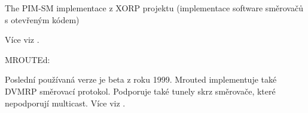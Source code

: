 The PIM-SM implementace z XORP projektu (implementace software směrovačů s otevřeným kódem)

\vspace{10pt}

Více viz \cite{pimdURL}.

\vspace{10pt}

MROUTEd:

\vspace{5pt}

Poslední používaná verze je beta z roku 1999. Mrouted implementuje také DVMRP směrovací protokol. Podporuje také tunely skrz směrovače, které nepodporují multicast. Více viz \cite{mroutedURL}.

\vspace{10pt}

